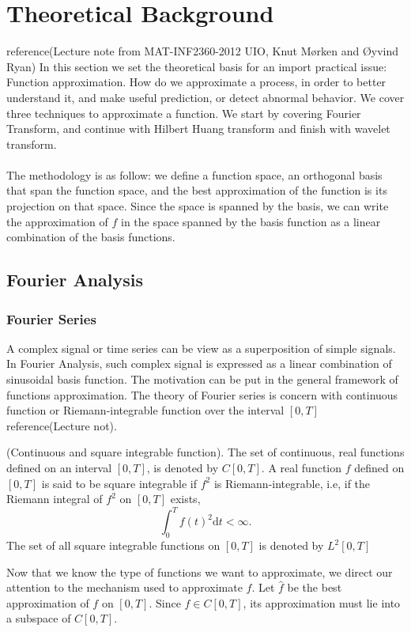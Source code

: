 \documentclass[../Main/thesis.tex]{subfiles}
\begin{document}
\chapter[Theoretical Background]{Theoretical Background}
reference(Lecture note from MAT-INF2360-2012 UIO, Knut Mørken and Øyvind Ryan)
In this section we set the theoretical basis for an import practical issue: Function approximation. How do we approximate a process, in order to better understand it, and 
make useful prediction, or detect abnormal behavior. We cover three techniques to approximate a function. We start by covering Fourier Transform, and continue with Hilbert Huang transform and finish with wavelet transform. \\
\\
The methodology is as follow: we define a function space, an orthogonal basis that span the function space, and the best approximation of the function is its projection on that space. Since the space is spanned by the basis, we can write the approximation of $f$ in the space spanned by the basis function as a linear combination of the basis functions.

\label{ch:ml}
\section{Fourier Analysis}

\subsection{Fourier Series}
A complex signal or time series can be view as a superposition of simple signals. In Fourier Analysis, such complex signal is expressed as a linear combination of sinusoidal basis function. The motivation can be put in the general framework of functions approximation. The theory of Fourier series is concern with continuous function or Riemann-integrable function over the interval $[0,T]$ reference(Lecture not).

\begin{definition}{(Continuous and square integrable function).}
The set of continuous, real functions defined on an interval $[0,T]$, is denoted by $C[0,T]$. 
A real function $f$ defined on $[0,T]$ is said to be square integrable if $f^{2}$ is Riemann-integrable, i.e, if the Riemann integral of $f^{2}$ on $[0,T]$ exists, 
\begin{equation}
\int_{0}^{T}f(t)^{2}\mathrm{d}t < \infty. \nonumber
\end{equation}
The set of all square integrable functions on $[0,T]$ is denoted by $L^{2}[0,T]$
\end{definition}
Now that we know the type of functions we want to approximate, we direct our attention to the mechanism used to approximate $f$. Let $\hat{f}$ be the best approximation of $f$ on $[0,T]$.
Since $f \in C[0,T]$, its approximation must lie into a subspace of $C[0,T]$.
\end{document}
